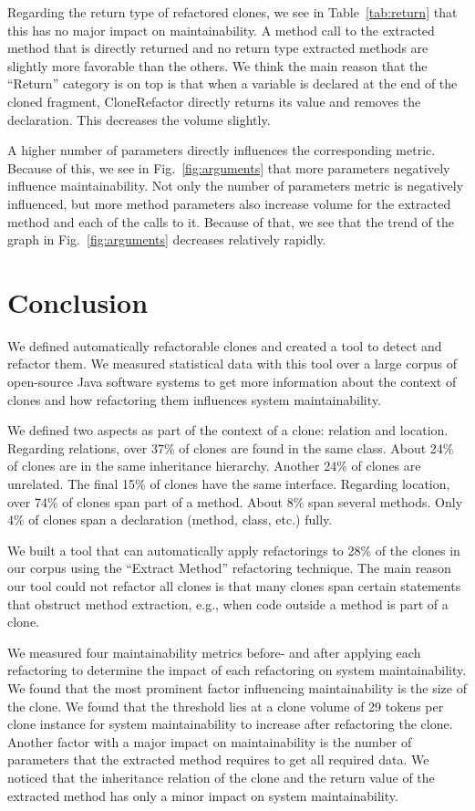 \documentclass[conference]{IEEEtran}
\begin{document}
Regarding the return type of refactored clones, we see in Table~\ref{tab:return} that this has no major impact on maintainability. A method call to the extracted method that is directly returned and no return type extracted methods are slightly more favorable than the others. We think the main reason that the ``Return'' category is on top is that when a variable is declared at the end of the cloned fragment, CloneRefactor directly returns its value and removes the declaration. This decreases the volume slightly.

A higher number of parameters directly influences the corresponding metric. Because of this, we see in Fig.~\ref{fig:arguments} that more parameters negatively influence maintainability. Not only the number of parameters metric is negatively influenced, but more method parameters also increase volume for the extracted method and each of the calls to it. Because of that, we see that the trend of the graph in Fig.~\ref{fig:arguments} decreases relatively rapidly.

\section{Conclusion}
We defined automatically refactorable clones and created a tool to detect and refactor them. We measured statistical data with this tool over a large corpus of open-source Java software systems to get more information about the context of clones and how refactoring them influences system maintainability.

We defined two aspects as part of the context of a clone: relation and location. Regarding relations, over 37\% of clones are found in the same class. About 24\% of clones are in the same inheritance hierarchy. Another 24\% of clones are unrelated. The final 15\% of clones have the same interface. Regarding location, over 74\% of clones span part of a method. About 8\% span several methods. Only 4\% of clones span a declaration (method, class, etc.) fully.

We built a tool that can automatically apply refactorings to 28\% of the clones in our corpus using the ``Extract Method'' refactoring technique. The main reason our tool could not refactor all clones is that many clones span certain statements that obstruct method extraction, e.g., when code outside a method is part of a clone.

We measured four maintainability metrics before- and after applying each refactoring to determine the impact of each refactoring on system maintainability. We found that the most prominent factor influencing maintainability is the size of the clone. We found that the threshold lies at a clone volume of 29 tokens per clone instance for system maintainability to increase after refactoring the clone. Another factor with a major impact on maintainability is the number of parameters that the extracted method requires to get all required data. We noticed that the inheritance relation of the clone and the return value of the extracted method has only a minor impact on system maintainability.


\end{document}
